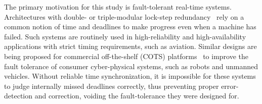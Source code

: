 The primary motivation for this study is fault-tolerant real-time systems.
Architectures with double- or triple-modular lock-step redundancy~\cite{triple-modular-redundancy,triple-modular-redundancy-evaluation,triple-modular-lock-step-arm}
rely on a common notion of time and deadlines to make progress even when a machine has failed.
Such systems are routinely used in high-reliability and high-availability applications with strict timing requirements, such as aviation.
Similar designs are being proposed for commercial off-the-shelf (COTS) platforms~\cite{gujarati2022concretes,gandhi2021rebound,loveless2021igor} to improve the fault tolerance of consumer cyber-physical systems, such as robots and unmanned vehicles.
Without reliable time synchronization, it is impossible for these systems to judge internally missed deadlines correctly, thus preventing proper error-detection and correction, voiding the fault-tolerance they were designed for.


